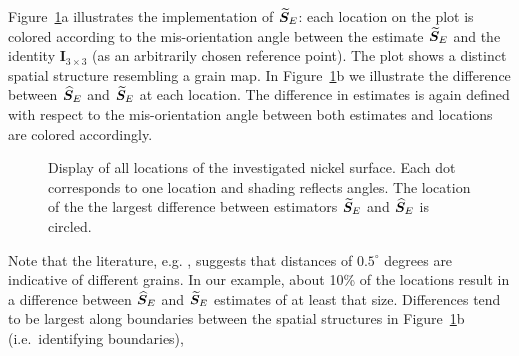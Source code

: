 Figure~\ref{fig:grain-map}a illustrates the implementation of ${\widetilde{\bm S}_E}$: each location on the plot is colored according to the mis-orientation angle between  the estimate ${\widetilde{\bm S}_E}$  and the identity $\bm I_{3\times 3}$ (as an arbitrarily chosen reference point).  The plot shows a distinct spatial structure resembling a grain map. In Figure~\ref{fig:grain-map}b we illustrate the difference between ${\widehat{\bm S}_E}$ and ${\widetilde{\bm S}_E}$ at each location. The difference in estimates is again defined with respect to the mis-orientation angle between both estimates and locations are colored accordingly. 
%
\begin{figure}[h!] %
   \centering
    \hfill
   \caption{ \label{fig:grain-map}  Display of all locations of the investigated nickel surface. Each dot corresponds to one location and shading reflects  angles. The location of the the largest difference between estimators ${\widetilde{\bm S}_E}$ and ${\widehat{\bm S}_E}$ is circled. }
\end{figure}
%
Note that the literature, e.g. \cite{bingham10b}, suggests that distances of $0.5^\circ$ degrees are indicative of different grains. In our example, about 10\% of the locations result in a difference between ${\widehat{\bm S}_E}$ and ${\widetilde{\bm S}_E}$ estimates of at least that size. Differences tend to be largest along boundaries between the spatial structures in Figure~\ref{fig:grain-map}b  (i.e.~identifying boundaries), 

